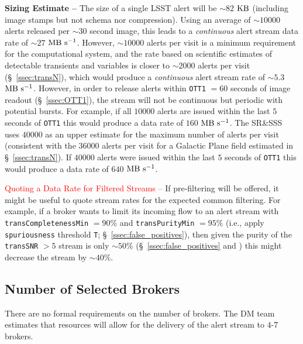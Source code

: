 \documentclass[DM,authoryear,toc]{lsstdoc}
\begin{document}

{\bf Sizing Estimate --} The size of a single LSST alert will be $\sim82$ $\rm KB$ (including image stamps but not schema nor compression). Using an average of $\sim10000$ alerts released per $\sim30$ second image, this leads to a {\it continuous} alert stream data rate of  $\sim27$ $\rm MB\ s^{-1}$. However, $\sim10000$ alerts per visit is a minimum requirement for the computational system, and the rate based on scientific estimates of detectable transients and variables is closer to $\sim2000$ alerts per visit (\S~\ref{ssec:transN}), which would produce a {\it continuous} alert stream rate of $\sim5.3$ $\rm MB\ s^{-1}$. However, in order to release alerts within {\tt OTT1} $=60$ seconds of image readout (\S~\ref{ssec:OTT1}), the stream will not be continuous but periodic with potential bursts. For example, if all $10000$ alerts are issued within the last $5$ seconds of {\tt OTT1} this would produce a data rate of $160$ $\rm MB\ s^{-1}$. The SR\&SSS  uses $40000$ as an upper estimate for the maximum number of alerts per visit (consistent with the $36000$ alerts per visit for a Galactic Plane field estimated in \S~\ref{ssec:transN}). If $40000$ alerts were issued within the last $5$ seconds of {\tt OTT1} this would produce a data rate of $640$ $\rm MB\ s^{-1}$.

\textcolor{red}{Quoting a Data Rate for Filtered Streams --} If pre-filtering will be offered, it might be useful to quote stream rates for the expected common filtering. For example, if a broker wants to limit its incoming flow to an alert stream with {\tt transCompletenessMin} $=90\%$ and {\tt transPurityMin} $=95\%$ (i.e., apply {\tt spuriousness} threshold {\tt T}; \S~\ref{ssec:false_positives}), then given the purity of the {\tt transSNR} $>5$ stream is only $\sim50\%$ (\S~\ref{ssec:false_positives} and ) this might decrease the stream by $\sim40\%$. 



\subsection{Number of Selected Brokers}\label{ssec:num_brokers}

There are no formal requirements on the number of brokers. The DM team estimates that resources will allow for the delivery of the alert stream to $4$-$7$ brokers.
\end{document}
